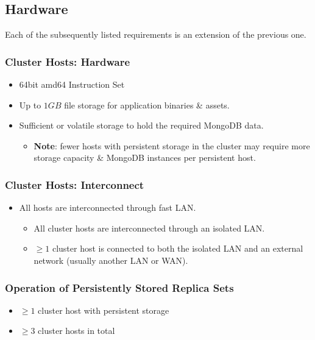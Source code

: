 \documentclass[a4paper, 11pt]{article}
\begin{document}
\subsection{Hardware}
Each of the subsequently listed requirements is an extension of the previous one.
\subsubsection{Cluster Hosts: Hardware}
\begin{itemize}
	\item 64bit amd64 Instruction Set
	\item Up to $1GB$ file storage for \mamid application binaries \& assets.
	\item Sufficient  or \gls{volatile storage} to hold the required \gls{MongoDB} data. \\
	\begin{itemize}
		\item \textbf{Note}: fewer \glspl{host} with \gls{persistent storage} in the cluster may require more storage capacity \& \gls{MongoDB} instances per persistent host.
	\end{itemize}
\end{itemize}

\subsubsection{Cluster Hosts: Interconnect}
\begin{itemize}
	\item All hosts are interconnected through fast \acrshort{LAN}.
	\begin{itemize}
		\item All cluster hosts are interconnected through an isolated \acrshort{LAN}.
		\item $\geq 1$ cluster host is connected to both the isolated \acrshort{LAN} and an external network (usually another \acrshort{LAN} or \acrshort{WAN}).
	\end{itemize}
\end{itemize}

\subsubsection{Operation of Persistently Stored Replica Sets}
\begin{itemize}
	\item $\geq 1$ cluster host with \gls{persistent storage}
	\item $\geq 3$ cluster hosts in total
\end{itemize}
\end{document}
